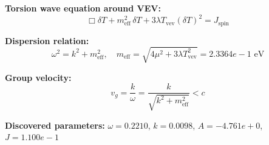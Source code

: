 
\textbf{Torsion wave equation around VEV:}
\begin{equation}
  \Box \delta T + m_{\text{eff}}^2 \, \delta T + 3\lambda T_{\text{vev}} (\delta T)^2 = J_{\text{spin}}
\end{equation}

\textbf{Dispersion relation:}
\begin{equation}
  \omega^2 = k^2 + m_{\text{eff}}^2, \quad
  m_{\text{eff}} = \sqrt{4\mu^2 + 3\lambda T_{\text{vev}}^2} = 2.3364e-1 \text{ eV}
\end{equation}

\textbf{Group velocity:}
\begin{equation}
  v_g = \frac{k}{\omega} = \frac{k}{\sqrt{k^2 + m_{\text{eff}}^2}} < c
\end{equation}

\textbf{Discovered parameters:}
$\omega = 0.2210$, \quad
$k = 0.0098$, \quad
$A = -4.761e+0$, \quad
$J = 1.100e-1$